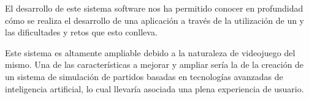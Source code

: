 El desarrollo de este sistema software nos ha permitido conocer en profundidad
cómo se realiza el desarrollo de una aplicación a través de la utilización de un
 y las dificultades y retos que esto conlleva.

Este sistema es altamente ampliable debido a la naturaleza de videojuego del
mismo. Una de las características a mejorar y ampliar sería la de la creación de
un sistema de simulación de partidos basadas en tecnologías avanzadas de
inteligencia artificial, lo cual llevaría asociada una plena experiencia de usuario.
